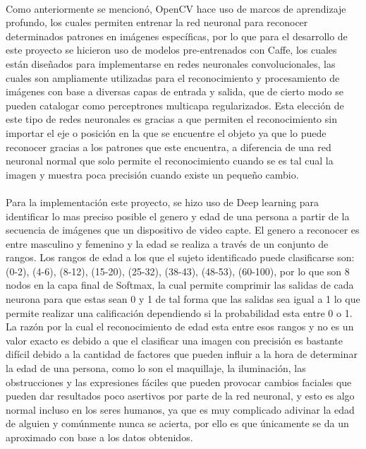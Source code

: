 \documentclass[9pt]{report}
\begin{document}
\begin{multicols}{2}
	\paragraph{}
	Como anteriormente se mencionó, OpenCV hace uso de marcos de aprendizaje profundo, los cuales permiten entrenar la red neuronal para reconocer determinados patrones en imágenes específicas, por lo que para el desarrollo de este proyecto se hicieron uso de modelos pre-entrenados con Caffe, los cuales están diseñados para implementarse en redes neuronales convolucionales, las cuales son ampliamente utilizadas para el reconocimiento y procesamiento de imágenes con base a diversas capas de entrada y salida, que de cierto modo se pueden catalogar como perceptrones multicapa regularizados. Esta elección de este tipo de redes neuronales es gracias a que permiten el reconocimiento sin importar el eje o posición en la que se encuentre el objeto ya que lo puede reconocer gracias a los patrones que este encuentra, a diferencia de una red neuronal normal que solo permite el reconocimiento cuando se es tal cual la imagen y muestra poca precisión cuando existe un pequeño cambio.
	\paragraph{}
	Para la implementación este proyecto, se hizo uso de Deep learning para identificar lo mas preciso posible el genero y edad de una persona a partir de la secuencia de imágenes que un dispositivo de video capte. El genero a reconocer es entre masculino y femenino y la edad se realiza a través de un conjunto de rangos. Los rangos de edad a los que el sujeto identificado puede clasificarse son: (0-2), (4-6), (8-12), (15-20), (25-32), (38-43), (48-53), (60-100), por lo que son 8 nodos en la capa final de Softmax, la cual permite comprimir las salidas de cada neurona para que estas sean 0 y 1 de tal forma que las salidas sea igual a 1 lo que permite realizar una calificación dependiendo si la probabilidad esta entre 0 o 1. La razón por la cual el reconocimiento de edad esta entre esos rangos y no es un valor exacto es debido a que el clasificar una imagen con precisión es bastante difícil debido a la cantidad de factores que pueden influir a la hora de determinar la edad de una persona, como lo son el maquillaje, la iluminación, las obstrucciones y las expresiones fáciles que pueden provocar cambios faciales que pueden dar resultados poco asertivos por parte de la red neuronal, y esto es algo normal incluso en los seres humanos, ya que es muy complicado adivinar la edad de alguien y comúnmente nunca se acierta, por ello es que únicamente se da un aproximado con base a los datos obtenidos.

\end{multicols}
\end{document}
